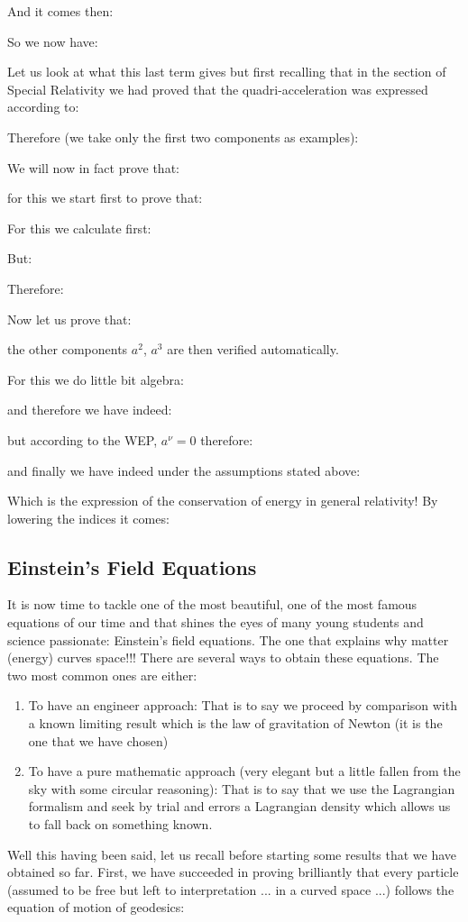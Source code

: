 	And it comes then:
	
	So we now have:
	
	Let us look at what this last term gives but first recalling that in the section of Special Relativity we had proved that the quadri-acceleration was expressed according to:
	
	Therefore (we take only the first two components as examples):
	
	We will now in fact prove that:
	
	for this we start first to prove that:
	
	For this we calculate first:
	
	But:
	
	Therefore:
	
	Now let us prove that:
	
	the other components $a^2$, $a^3$ are then verified automatically.

	For this we do little bit algebra:
	
	and therefore we have indeed:
	
	but according to the WEP, $a^\nu=0$ therefore:
	
	and finally we have indeed under the assumptions stated above:
	
	Which is the expression of the conservation of energy in general relativity! By lowering the indices it comes:
	
	
	\pagebreak
	\subsection{Einstein's Field Equations}
	It is now time to tackle one of the most beautiful, one of the most famous equations of our time and that shines the eyes of many young students and science passionate: Einstein's field equations. The one that explains why matter (energy) curves space!!! There are several ways to obtain these equations. The two most common ones are either:
	\begin{enumerate}
		\item To have an engineer approach: That is to say we proceed by comparison with a known limiting result which is the law of gravitation of Newton (it is the one that we have chosen)

		\item To have a pure mathematic approach (very elegant but a little fallen from the sky with some circular reasoning): That is to say that we use the Lagrangian formalism and seek by trial and errors a Lagrangian density which allows us to fall back on something known.
	\end{enumerate}
	Well this having been said, let us recall before starting some results that we have obtained so far. First, we have succeeded in proving brilliantly that every particle (assumed to be free but left to interpretation ... in a curved space ...) follows the equation of motion of geodesics:
	
